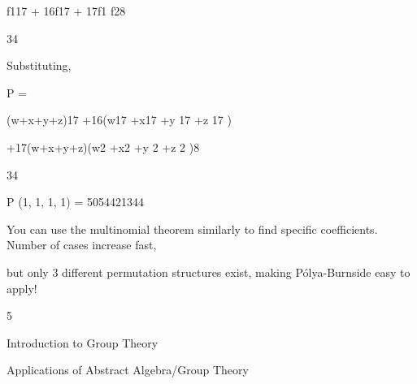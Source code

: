 \documentclass[a4paper,portrait,12pt]{article}
\begin{document}
\begin{flushleft}
f117 + 16f17 + 17f1 f28
\end{flushleft}


34





\begin{flushleft}
Substituting,
\end{flushleft}


\begin{flushleft}
P =
\end{flushleft}





\begin{flushleft}
(w+x+y+z)17 +16(w17 +x17 +y 17 +z 17 )
\end{flushleft}


\begin{flushleft}
+17(w+x+y+z)(w2 +x2 +y 2 +z 2 )8
\end{flushleft}





34





\begin{flushleft}
P (1, 1, 1, 1) = 5054421344
\end{flushleft}


\begin{flushleft}
You can use the multinomial theorem similarly to find specific coefficients. Number of cases increase fast,
\end{flushleft}


\begin{flushleft}
but only 3 different permutation structures exist, making P\'{o}lya-Burnside easy to apply!
\end{flushleft}





5





\begin{flushleft}
Introduction to Group Theory
\end{flushleft}





\begin{flushleft}
Applications of Abstract Algebra/Group Theory
\end{flushleft}
\end{document}
